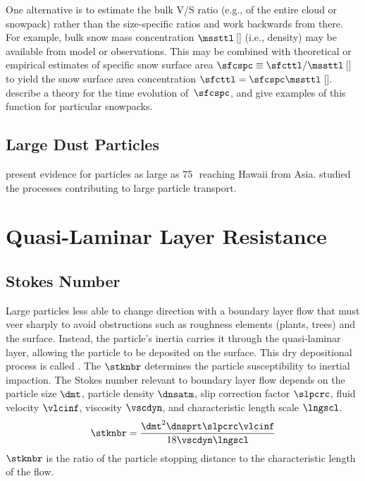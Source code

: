\documentclass[12pt,twoside]{book}
\begin{document}
One alternative is to estimate the bulk V/S ratio (e.g., of the entire
cloud or snowpack) rather than the size-specific ratios and work
backwards from there.
For example, bulk snow mass concentration $\mssttl$\,[\kgxmC] 
(i.e., density) may be available from model or observations. 
This may be combined with theoretical or empirical estimates of 
specific snow surface area $\sfcspc \equiv \sfcttl/\mssttl$\,[\mSxkg]
to yield the snow surface area concentration 
$\sfcttl = \sfcspc\mssttl$\,[\mSxmC]. 
\cite{LTD04} describe a theory for the time evolution of~$\sfcspc$,
and \cite{CLD03} give examples of this function for particular
snowpacks. 

\subsection[Large Dust Particles]{Large Dust Particles}\label{sxn:ldp}
\cite{BCD88} present evidence for particles as large as 75\,\um\
reaching Hawaii from Asia.
\cite{Gin03} studied the processes contributing to large particle
transport. 

\section{Quasi-Laminar Layer Resistance}\label{sxn:qll}

\subsection[Stokes Number]{Stokes Number}\label{sxn:stk}
Large particles less able to change direction with a boundary
layer flow that must veer sharply to avoid obstructions such as  
roughness elements (plants, trees) and the surface.
Instead, the particle's inertia carries it through the quasi-laminar
layer, allowing the particle to be deposited on the surface.
This dry depositional process is called .
The \trmdfn{Stokes number} $\stknbr$ determines the particle
susceptibility to inertial impaction.
The Stokes number relevant to boundary layer flow depends on the
particle size $\dmt$, particle density $\dnsatm$, slip correction
factor $\slpcrc$, fluid velocity $\vlcinf$, viscosity $\vscdyn$, and
characteristic length scale $\lngscl$.   
\begin{equation}
\stknbr = \frac{\dmt^{2} \dnsprt \slpcrc \vlcinf}{18 \vscdyn \lngscl }
\label{eqn:stk_nbr_dfn_1}
\end{equation}
$\stknbr$ is the ratio of the particle stopping distance to the
characteristic length of the flow.  
\end{document}

